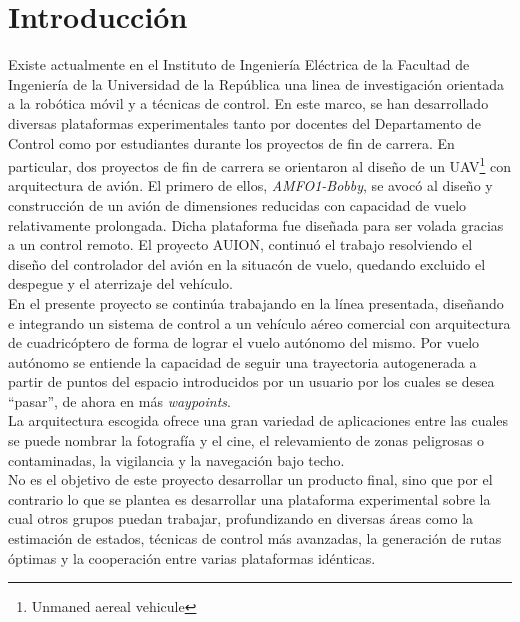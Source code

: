 \documentclass[main]{subfiles}
\begin{document}
\chapter*{Introducci\'on}

Existe actualmente en el Instituto de Ingenier\'ia El\'ectrica de la Facultad de Ingenier\'ia de la Universidad de la Rep\'ublica una linea de investigaci\'on orientada a la rob\'otica m\'ovil y a t\'ecnicas de control. En este marco, se han desarrollado diversas plataformas experimentales tanto por docentes del Departamento de Control como por estudiantes durante los proyectos de fin de carrera. En particular, dos proyectos de fin de carrera se orientaron al diseño de un UAV\footnote{Unmaned aereal vehicule} con arquitectura de avi\'on. El primero de ellos, \emph{AMFO1-Bobby}, se avoc\'o al diseño y construcci\'on de un avi\'on de dimensiones reducidas con capacidad de vuelo relativamente prolongada. Dicha plataforma fue dise\~nada para ser volada gracias a un control remoto. El proyecto AUION, continu\'o el trabajo resolviendo el diseño del controlador del avi\'on en la situac\'on de vuelo, quedando excluido el despegue y el aterrizaje del veh\'iculo.\\

En el presente proyecto se contin\'ua trabajando en la línea presentada, dise\~nando e integrando un sistema de control a un veh\'iculo a\'ereo comercial con arquitectura de cuadric\'optero de forma de lograr el vuelo aut\'onomo del mismo. Por vuelo aut\'onomo se entiende la capacidad de seguir una trayectoria autogenerada a partir de puntos del espacio introducidos por un usuario por los cuales se desea ``pasar'', de ahora en m\'as \emph{waypoints}. \\

La arquitectura escogida ofrece una gran variedad de aplicaciones entre las cuales se puede nombrar la fotograf\'ia y el cine, el relevamiento de zonas peligrosas o contaminadas, la  vigilancia y la navegaci\'on bajo techo. \\

No es el objetivo de este proyecto desarrollar un producto final, sino que por el contrario lo que se plantea es desarrollar una plataforma experimental sobre la cual otros grupos puedan trabajar, profundizando en diversas \'areas como la estimaci\'on de estados, t\'ecnicas de control m\'as avanzadas, la generaci\'on de rutas \'optimas y la cooperaci\'on entre varias plataformas id\'enticas.\\
\end{document}
